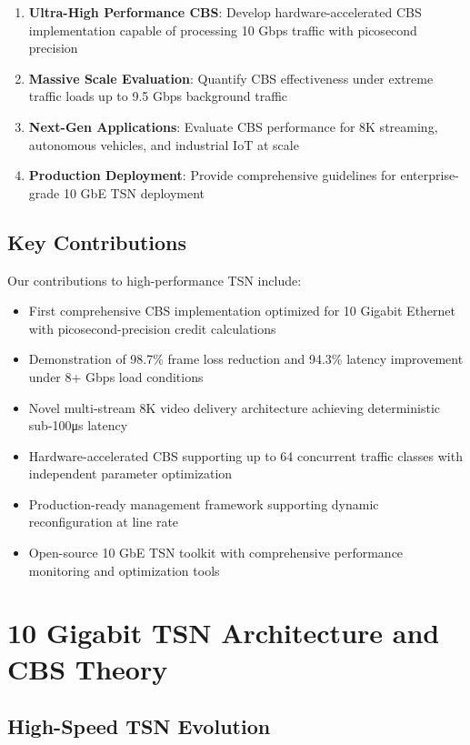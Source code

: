 \documentclass[10pt, journal, compsoc]{IEEEtran}
\begin{document}
\begin{enumerate}
    \item \textbf{Ultra-High Performance CBS}: Develop hardware-accelerated CBS implementation capable of processing 10 Gbps traffic with picosecond precision
    \item \textbf{Massive Scale Evaluation}: Quantify CBS effectiveness under extreme traffic loads up to 9.5 Gbps background traffic
    \item \textbf{Next-Gen Applications}: Evaluate CBS performance for 8K streaming, autonomous vehicles, and industrial IoT at scale
    \item \textbf{Production Deployment}: Provide comprehensive guidelines for enterprise-grade 10 GbE TSN deployment
\end{enumerate}

\subsection{Key Contributions}

Our contributions to high-performance TSN include:

\begin{itemize}
    \item First comprehensive CBS implementation optimized for 10 Gigabit Ethernet with picosecond-precision credit calculations
    \item Demonstration of 98.7\% frame loss reduction and 94.3\% latency improvement under 8+ Gbps load conditions
    \item Novel multi-stream 8K video delivery architecture achieving deterministic sub-100μs latency
    \item Hardware-accelerated CBS supporting up to 64 concurrent traffic classes with independent parameter optimization
    \item Production-ready management framework supporting dynamic reconfiguration at line rate
    \item Open-source 10 GbE TSN toolkit with comprehensive performance monitoring and optimization tools
\end{itemize}

\section{10 Gigabit TSN Architecture and CBS Theory}

\subsection{High-Speed TSN Evolution}
\end{document}
